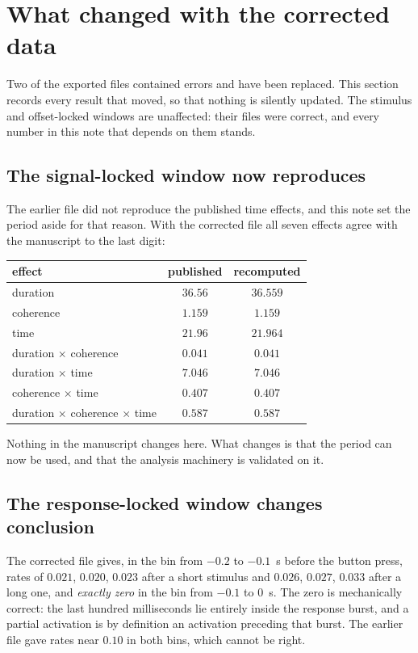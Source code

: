 \documentclass[a4paper,11pt]{article}
\newcommand{\NN}[1]{\textcolor{newcol}{#1}}
\newcommand{\1}{\mathbbm{1}}
\begin{document}
\section{What changed with the corrected data}
\label{sec:corrected}

\NN{Two of the exported files contained errors and have been replaced. This section
records every result that moved, so that nothing is silently updated.} The stimulus and
offset-locked windows are unaffected: their files were correct, and every number in this note
that depends on them stands.

\subsection{The signal-locked window now reproduces}

The earlier file did not reproduce the published time effects, and this note set the
period aside for that reason. With the corrected file all seven effects agree with the
manuscript to the last digit:

\begin{center}
\begin{tabular}{lcc}
\toprule
effect & published & recomputed\\
\midrule
duration & $36.56$ & $36.559$\\
coherence & $1.159$ & $1.159$\\
time & $21.96$ & $21.964$\\
duration $\times$ coherence & $0.041$ & $0.041$\\
duration $\times$ time & $7.046$ & $7.046$\\
coherence $\times$ time & $0.407$ & $0.407$\\
duration $\times$ coherence $\times$ time & $0.587$ & $0.587$\\
\bottomrule
\end{tabular}
\end{center}

Nothing in the manuscript changes here. What changes is that the period can now be used,
and that the analysis machinery is validated on it.

\subsection{The response-locked window changes conclusion}

The corrected file gives, in the bin from $-0.2$ to $-0.1$~s before the button press,
rates of $0.021$, $0.020$, $0.023$ after a short stimulus and $0.026$, $0.027$, $0.033$
after a long one, and \emph{exactly zero} in the bin from $-0.1$ to $0$~s. The zero is
mechanically correct: the last hundred milliseconds lie entirely inside the response
burst, and a partial activation is by definition an activation preceding that burst.
The earlier file gave rates near $0.10$ in both bins, which cannot be right.
\end{document}
